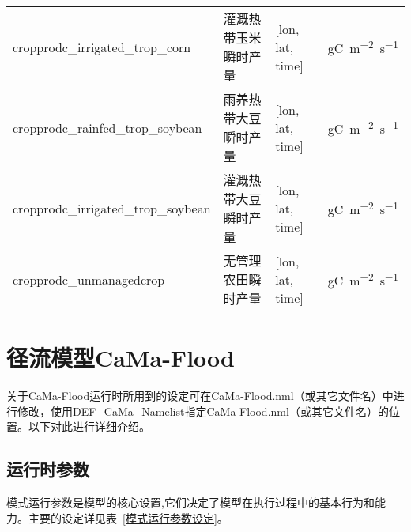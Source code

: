 {\begin{longtable}[htbp]{lp{}ll}
cropprodc\_irrigated\_trop\_corn & 灌溉热带玉米瞬时产量 & {[}lon, lat, time{]} & \unit{gC.m^{-2}.s^{-1}} \\
cropprodc\_rainfed\_trop\_soybean & 雨养热带大豆瞬时产量 & {[}lon, lat, time{]} & \unit{gC.m^{-2}.s^{-1}} \\
cropprodc\_irrigated\_trop\_soybean & 灌溉热带大豆瞬时产量 & {[}lon, lat, time{]} & \unit{gC.m^{-2}.s^{-1}} \\
cropprodc\_unmanagedcrop & 无管理农田瞬时产量 & {[}lon, lat, time{]} & \unit{gC.m^{-2}.s^{-1}} \\
\end{longtable}}

\section{径流模型CaMa-Flood}
关于CaMa-Flood运行时所用到的设定可在CaMa-Flood.nml（或其它文件名）中进行修改，使用DEF\_CaMa\_Namelist指定CaMa-Flood.nml（或其它文件名）的位置。以下对此进行详细介绍。
\subsection{运行时参数}
模式运行参数是模型的核心设置,它们决定了模型在执行过程中的基本行为和能力。主要的设定详见表~\ref{模式运行参数设定}。

